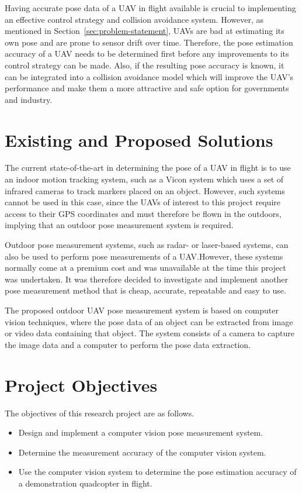 Having accurate pose data of a UAV in flight available is crucial to implementing an effective control strategy and collision avoidance system. However, as mentioned in Section~\ref{sec:problem-statement}, UAVs are bad at estimating its own pose and are prone to sensor drift over time. Therefore, the pose estimation accuracy of a UAV needs to be determined first before any improvements to its control strategy can be made. Also, if the resulting pose accuracy is known, it can be integrated into a collision avoidance model which will improve the UAV's performance and make them a more attractive and safe option for governments and industry. 

\section{Existing and Proposed Solutions}

The current state-of-the-art in determining the pose of a UAV in flight is to use an indoor motion tracking system, such as a Vicon system which uses a set of infrared cameras to track markers placed on an object. However, such systems cannot be used in this case, since the UAVs of interest to this project require access to their GPS coordinates and must therefore be flown in the outdoors, implying that an outdoor pose measurement system is required. 

Outdoor pose measurement systems, such as radar- or laser-based systems, can also be used to perform pose measurements of a UAV.\@ However, these systems normally come at a premium cost  and was unavailable at the time this project was undertaken. It was therefore decided to investigate and implement another pose measurement method that is cheap, accurate, repeatable and easy to use. 

The proposed outdoor UAV pose measurement system is based on computer vision techniques, where the pose data of an object can be extracted from image or video data containing that object. The system consists of a camera to capture the image data and a computer to perform the pose data extraction. 

\section{Project Objectives}

The objectives of this research project are as follows. 

\begin{itemize}
  \item Design and implement a computer vision pose measurement system.
  \item Determine the measurement accuracy of the computer vision system.
  \item Use the computer vision system to determine the pose estimation accuracy of a demonstration quadcopter in flight. 
\end{itemize}

